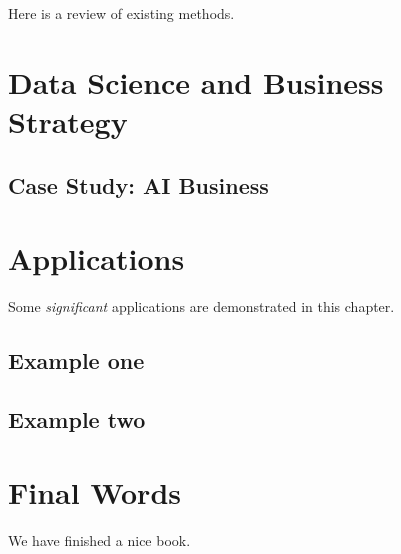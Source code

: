 \documentclass[
]{book}
\begin{document}
Here is a review of existing methods.

\hypertarget{businessstrategy}{%
\chapter{Data Science and Business Strategy}\label{businessstrategy}}

\hypertarget{case-study-ai-business}{%
\section{Case Study: AI Business}\label{case-study-ai-business}}

\hypertarget{applications}{%
\chapter{Applications}\label{applications}}

Some \emph{significant} applications are demonstrated in this chapter.

\hypertarget{example-one}{%
\section{Example one}\label{example-one}}

\hypertarget{example-two}{%
\section{Example two}\label{example-two}}

\hypertarget{final-words}{%
\chapter{Final Words}\label{final-words}}

We have finished a nice book.

  
\end{document}
